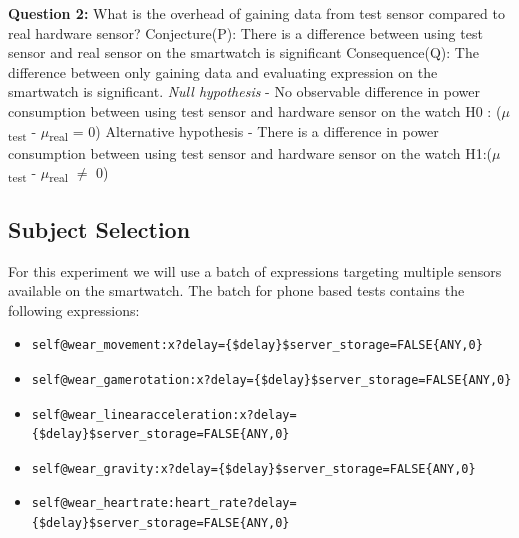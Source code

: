     \textbf{Question 2:}  What is the overhead of gaining data from test sensor compared to real hardware sensor?\newline
    Conjecture(P): There is  a difference between using test sensor and real sensor on the smartwatch is significant\newline
    Consequence(Q): The difference between only gaining data and evaluating expression on the smartwatch is significant.\newline
    \textit{Null hypothesis} - No observable difference in power consumption between using test sensor and hardware sensor on the watch\newline
H0 : ($\mu$\textsubscript{test} - $\mu$\textsubscript{real} = 0)\newline
    Alternative hypothesis - There is a difference in power consumption between using test sensor and hardware sensor on the watch\newline
H1:($\mu$\textsubscript{test} - $\mu$\textsubscript{real} $\neq$ 0)\newline

\subsection{Subject Selection}
For this experiment we will use a batch of expressions targeting multiple sensors available on the smartwatch.
The batch for phone based tests contains the following expressions:
\begin{itemize}
 \item \begin{verbatim}self@wear_movement:x?delay={$delay}$server_storage=FALSE{ANY,0}\end{verbatim}
 \item \begin{verbatim}self@wear_gamerotation:x?delay={$delay}$server_storage=FALSE{ANY,0}\end{verbatim}
 \item \begin{verbatim}self@wear_linearacceleration:x?delay={$delay}$server_storage=FALSE{ANY,0}\end{verbatim}
 \item \begin{verbatim}self@wear_gravity:x?delay={$delay}$server_storage=FALSE{ANY,0}\end{verbatim}
 \item \begin{verbatim}self@wear_heartrate:heart_rate?delay={$delay}$server_storage=FALSE{ANY,0}\end{verbatim}
\end{itemize}

